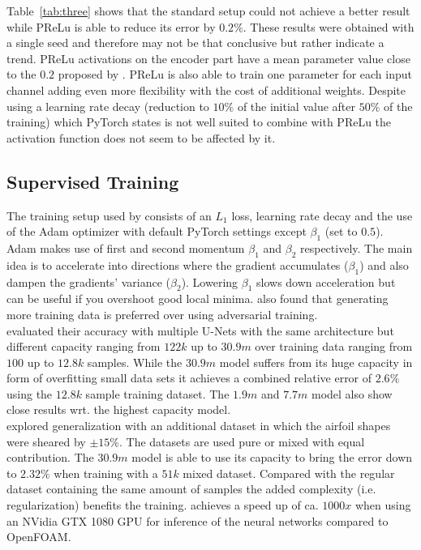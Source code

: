 \documentclass[acmtog]{techreportacmart}
\begin{document}
Table~\ref{tab:three} shows that the standard setup could not achieve a better result while PReLu is able to reduce its error by $0.2\%$. These results were obtained with a single seed and therefore may not be that conclusive but rather indicate a trend. PReLu activations on the encoder part have a mean parameter value close to the $0.2$ proposed by \cite{Thuerey20}. PReLu is also able to train one parameter for each input channel adding even more flexibility with the cost of additional weights. Despite \cite{Thuerey20} using a learning rate decay (reduction to $10\%$ of the initial value after $50\%$ of the training) which PyTorch states is not well suited to combine with PReLu the activation function does not seem to be affected by it.

\subsection{Supervised Training}
The training setup used by \cite{Thuerey20} consists of an $L_1$ loss, learning rate decay and the use of the Adam optimizer \cite{kingma2014adam} with default PyTorch settings except $\beta_1$ (set to $0.5$). Adam makes use of first and second momentum $\beta_1$ and $\beta_2$ respectively. The main idea is to accelerate into directions where the gradient accumulates ($\beta_1$) and also dampen the gradients' variance ($\beta_2$). Lowering  $\beta_1$ slows down acceleration but can be useful if you overshoot good local minima. \cite{Thuerey20} also found that generating more training data is preferred over using adversarial training.\\
\cite{Thuerey20} evaluated their accuracy with multiple U-Nets with the same architecture but different capacity ranging from $122k$ up to $30.9m$ over training data ranging from $100$ up to $12.8k$ samples. While the $30.9m$ model suffers from its huge capacity in form of overfitting small data sets it achieves a combined relative error of $2.6\%$ using the $12.8k$ sample training dataset. The $1.9m$ and $7.7m$ model also show close results wrt. the highest capacity model.\\
\cite{Thuerey20} explored generalization with an additional dataset in which the airfoil shapes were sheared by $\pm15\%$. The datasets are used pure or mixed with equal contribution.
The $30.9m$ model is able to use its capacity to bring the error down to $2.32\%$ when training with a $51k$ mixed dataset. Compared with the regular dataset containing the same amount of samples the added complexity (i.e. regularization) benefits the training.
\cite{Thuerey20} achieves a speed up of ca. $1000x$ when using an NVidia GTX 1080 GPU for inference of the neural networks compared to OpenFOAM.
\end{document}
